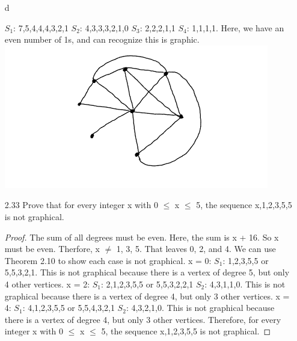 \documentclass[12pt]{article}
\begin{document}
\begin{enumerate}
\item[d] 
\begin{center}
    \newline
    $S_1$: 7,5,4,4,4,3,2,1
    \newline
    $S_2$: 4,3,3,3,2,1,0
    \newline
    $S_3$: 2,2,2,1,1
    \newline
    $S_4$: 1,1,1,1. Here, we have an even number of 1s, and can recognize this is graphic.
    \newline
    \includegraphics{graphd.png}

\end{center}


\item[2.33] Prove that for every integer x with 0 $\leq$ x $\leq$ 5, the sequence x,1,2,3,5,5 is not graphical.
\begin{proof}
    The sum of all degrees must be even. Here, the sum is x + 16. So x must be even. Therfore, x $\neq$ 1, 3, 5.
    That leaves 0, 2, and 4. We can use Theorem 2.10 to show each case is not graphical.
    \newline
    x = 0:
    $S_1$: 1,2,3,5,5 or 5,5,3,2,1. This is not graphical because there is a vertex of degree 5, but only 4 other vertices.
    \newline
    x = 2:
    $S_1$: 2,1,2,3,5,5 or 5,5,3,2,2,1
    \newline
    $S_2$: 4,3,1,1,0. This is not graphical because there is a vertex of degree 4, but only 3 other vertices.
    \newline
    x = 4: 
    \newline
    $S_1$: 4,1,2,3,5,5 or 5,5,4,3,2,1    
    \newline
    $S_2$: 4,3,2,1,0. This is not graphical because there is a vertex of degree 4, but only 3 other vertices.
    \newline
    Therefore, for every integer x with 0 $\leq$ x $\leq$ 5, the sequence x,1,2,3,5,5 is not graphical. 
\end{proof} 


\end{enumerate}
\end{document}
